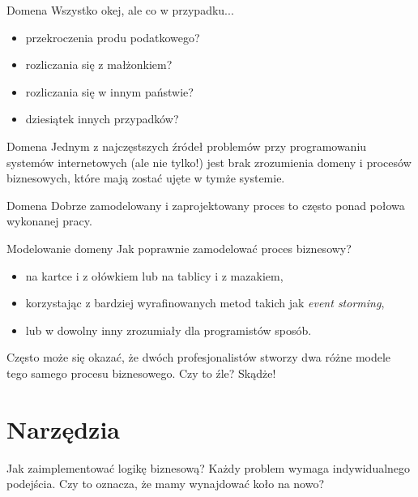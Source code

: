\begin{frame}{Domena}
	Wszystko okej, ale co w przypadku...
	\begin{itemize}
	\item przekroczenia produ podatkowego?
	\item rozliczania się z małżonkiem?
	\item rozliczania się w innym państwie?
	\item dziesiątek innych przypadków?
	\end{itemize}
\end{frame}

\begin{frame}{Domena}
	Jednym z najczęstszych źródeł problemów przy programowaniu systemów internetowych (ale nie tylko!) jest brak zrozumienia domeny i procesów biznesowych, które mają zostać ujęte w tymże systemie.
\end{frame}

\begin{frame}{Domena}
	Dobrze zamodelowany i zaprojektowany proces to często ponad połowa wykonanej pracy.
\end{frame}

\begin{frame}{Modelowanie domeny}
	Jak poprawnie zamodelować proces biznesowy?
	\begin{itemize}
		\item na kartce i z ołówkiem lub na tablicy i z mazakiem,
		\item korzystając z bardziej wyrafinowanych metod takich jak \emph{event storming},
		\item lub w dowolny inny zrozumiały dla programistów sposób.
	\end{itemize}
	
	Często może się okazać, że dwóch profesjonalistów stworzy dwa różne modele tego samego procesu biznesowego. Czy to źle? Skądże!
\end{frame}

\section{Narzędzia}

\begin{frame}{Jak zaimplementować logikę biznesową?}
	Każdy problem wymaga indywidualnego podejścia. Czy to oznacza, że mamy wynajdować koło na nowo?
\end{frame}

